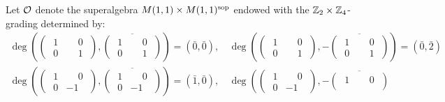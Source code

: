 \begin{ex}\label{ex:superalgebra-O}
    Let $\mathcal O$ denote the superalgebra $M(1,1) \times M(1,1)^{\mathrm{sop}}$ endowed with the $\mathbb{Z}_2\times \mathbb{Z}_4$-grading determined by:
    \begin{align*}
        \deg \left(\begin{pmatrix}
            \phantom{.}1 & \phantom{-}0\phantom{.}\\
            \phantom{.}0 & \phantom{-}1\phantom{.}
        \end{pmatrix}, \overline{\begin{pmatrix}
            \phantom{.}1 & \phantom{-}0\phantom{.}\\
            \phantom{.}0 & \phantom{-}1\phantom{.}
        \end{pmatrix}}\right) = (\bar 0, \bar 0),\,&
        \deg \left(\begin{pmatrix}
            \phantom{.}1 & \phantom{-}0\phantom{.}\\
            \phantom{.}0 & \phantom{-}1\phantom{.}
        \end{pmatrix}, -\overline{\begin{pmatrix}
            \phantom{.}1 & \phantom{-}0\phantom{.}\\
            \phantom{.}0 & \phantom{-}1\phantom{.}
        \end{pmatrix}}\right) = (\bar 0, \bar 2)\\
        \deg \left(\begin{pmatrix}
            \phantom{.}1 & \phantom{-}0\phantom{.}\\
            \phantom{.}0 & -1\phantom{.}
        \end{pmatrix}, \overline{\begin{pmatrix}
            \phantom{.}1 & \phantom{-}0\phantom{.}\\
            \phantom{.}0 & -1\phantom{.}
        \end{pmatrix}}\right) = (\bar 1, \bar 0),\,&
        \deg \left(\begin{pmatrix}
            \phantom{.}1 & \phantom{-}0\phantom{.}\\
            \phantom{.}0 & -1\phantom{.}
        \end{pmatrix}, -\overline{\begin{pmatrix}
            \phantom{.}1 & \phantom{-}0\phantom{.}\\

\end{pmatrix}}
\end{align*}
\end{ex}
